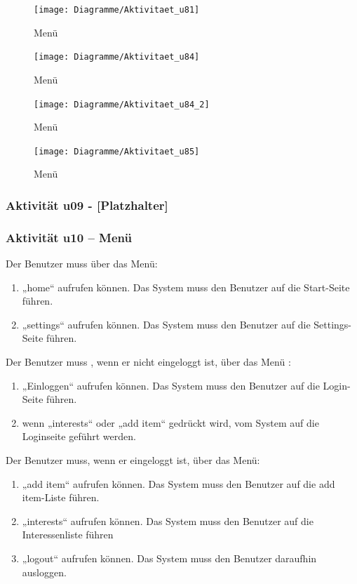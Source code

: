 \documentclass[a4paper,12pt,oneside]{scrartcl}
\begin{document}
\begin{figure}[!htbp]
\centering
\noindent\texttt{[image: Diagramme/Aktivitaet\_u81]}
\caption{Menü}
\end{figure}
\FloatBarrier

\begin{figure}[!htbp]
\centering
\noindent\texttt{[image: Diagramme/Aktivitaet\_u84]}
\caption{Menü}
\end{figure}
\FloatBarrier

\begin{figure}[!htbp]
\centering
\noindent\texttt{[image: Diagramme/Aktivitaet\_u84\_2]}
\caption{Menü}
\end{figure}
\FloatBarrier

\begin{figure}[!htbp]
\centering
\noindent\texttt{[image: Diagramme/Aktivitaet\_u85]}
\caption{Menü}
\end{figure}
\FloatBarrier

\subsubsection{Aktivität u09 - [Platzhalter]}

\subsubsection{Aktivität u10 – Menü}
Der Benutzer muss über das Menü:
\begin{enumerate}
	\item „home“ aufrufen können. Das System muss den Benutzer auf die Start-Seite führen.
	\item „settings“ aufrufen können. Das System muss den Benutzer auf die Settings-Seite führen.
\end{enumerate}
Der Benutzer muss , wenn er nicht eingeloggt ist, über das Menü :
\begin{enumerate}
	\item „Einloggen“ aufrufen können. Das System muss den Benutzer auf die Login-Seite führen.
	\item wenn „interests“ oder „add item“ gedrückt wird, vom System auf die Loginseite geführt werden.
\end{enumerate}
Der Benutzer muss, wenn er eingeloggt ist, über das Menü:
\begin{enumerate}
	\item „add item“ aufrufen können. Das System muss den Benutzer auf die add item-Liste führen.
	\item „interests“ aufrufen können. Das System muss den Benutzer auf die Interessenliste führen
	\item „logout“ aufrufen können. Das System muss den Benutzer daraufhin ausloggen. 
\end{enumerate}
\end{document}
